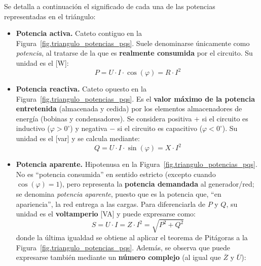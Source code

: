 	Se detalla a continuación el significado de cada una de las
        potencias representadas en el triángulo:
	\begin{itemize}
        \item \textbf{Potencia activa.} Cateto contiguo en la
          Figura~\ref{fig.triangulo_potencias_pqs}. Suele denominarse
          únicamente como \textit{potencia}, al tratarse de la que es
          \textbf{realmente consumida} por el circuito. Su unidad es
          el [W]:
          \begin{equation}\label{eq.Pactiva}
            \boxed{P = U\cdot I\cdot\cos(\varphi) = R \cdot I^2}
          \end{equation}
        \item \textbf{Potencia reactiva.} Cateto opuesto en la
          Figura~\ref{fig.triangulo_potencias_pqs}. Es el
          \textbf{valor máximo de la potencia entretenida} (almacenada
          y cedida) por los elementos almacenadores de energía
          (bobinas y condensadores). Se considera positiva $+$ si el
          circuito es inductivo ($\varphi>0^\circ$) y negativa $-$ si
          el circuito es capacitivo ($\varphi<0^\circ$). Su unidad es
          el [var] y se calcula mediante:
          \begin{equation}\label{eq.Qreactiva}
            \boxed{Q = U\cdot I\cdot\sin(\varphi) = X \cdot I^2}
          \end{equation}
        \item \textbf{Potencia aparente.} Hipotenusa en la
          Figura~\ref{fig.triangulo_potencias_pqs}. No es ``potencia
          consumida'' en sentido estricto (excepto cuando
          $\cos(\varphi)=1$), pero representa la \textbf{potencia
            demandada} al generador/red; se denomina \textit{potencia
            aparente}, puesto que es la potencia que, ``en
          apariencia'', la red entrega a las cargas. Para
          diferenciarla de $P$ y $Q$, su unidad es el
          \textbf{voltamperio} [VA] y puede expresarse como:
          \begin{equation}\label{eq.Saparente}
            \boxed{S = U\cdot I= Z \cdot I^2=\sqrt{P^2+Q^2}}
          \end{equation}
          donde la última igualdad se obtiene al aplicar el teorema de
          Pitágoras a la
          Figura~\ref{fig.triangulo_potencias_pqs}. Además, se observa
          que puede expresarse también mediante un \textbf{número
            complejo} (al igual que $\overline{Z}$ y $\overline{U}$):
          \begin{equation}

\end{equation}
\end{itemize}
